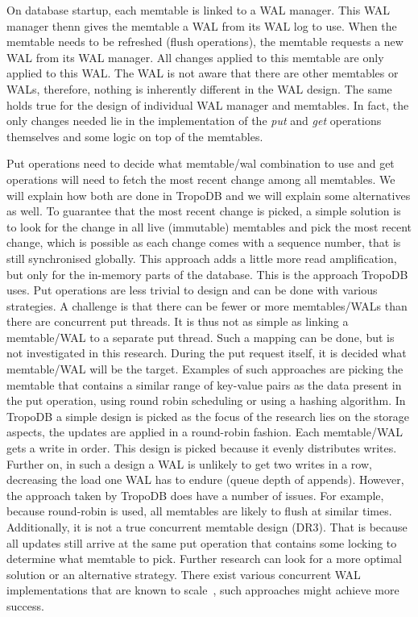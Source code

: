 On database startup, each memtable is linked to a WAL manager. This WAL manager thenn gives the memtable a WAL from its WAL log to use. When the memtable needs to be refreshed (flush operations), the memtable requests a new WAL from its WAL manager. All changes applied to this memtable are only applied to this WAL. The WAL is not aware that there are other memtables or WALs, therefore, nothing is inherently different in the WAL design. The same holds true for the design of individual WAL manager and memtables. In fact, the only changes needed lie in the implementation of the \textit{put} and \textit{get} operations themselves and some logic on top of the memtables. 

Put operations need to decide what memtable/wal combination to use and get operations will need to fetch the most recent change among all memtables. We will explain how both are done in TropoDB and we will explain some alternatives as well. To guarantee that the most recent change is picked, a simple solution is to look for the change in all live (immutable) memtables and pick the most recent change, which is possible as each change comes with a sequence number, that is still synchronised globally. This approach adds a little more read amplification, but only for the in-memory parts of the database. This is the approach TropoDB uses. Put operations are less trivial to design and can be done with various strategies. A challenge is that there can be fewer or more memtables/WALs than there are concurrent put threads. It is thus not as simple as linking a memtable/WAL to a separate put thread. Such a mapping can be done, but is not investigated in this research. During the put request itself, it is decided what memtable/WAL will be the target. Examples of such approaches are picking the memtable that contains a similar range of key-value pairs as the data present in the put operation, using round robin scheduling or using a hashing algorithm. In TropoDB a simple design is picked as the focus of the research lies on the storage aspects, the updates are applied in a round-robin fashion. Each memtable/WAL gets a write in order. This design is picked because it evenly distributes writes. Further on, in such a design a WAL is unlikely to get two writes in a row, decreasing the load one WAL has to endure (queue depth of appends). However, the approach taken by TropoDB does have a number of issues. For example, because round-robin is used, all memtables are likely to flush at similar times. Additionally, it is not a true concurrent memtable design (DR3). That is because all updates still arrive at the same put operation that contains some locking to determine what memtable to pick. Further research can look for a more optimal solution or an alternative strategy. There exist various concurrent WAL implementations that are known to scale~\cite{conway2020splinterdb, chen2021spandb}, such approaches might achieve more success. 
 
